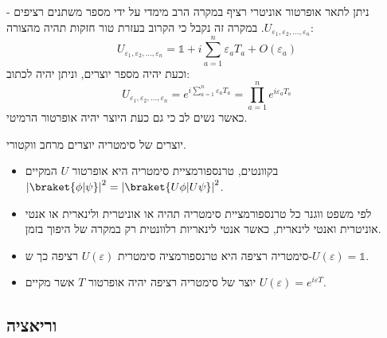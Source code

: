 \documentclass{tstextbook}
\begin{document}
\begin{proposition}
ניתן לתאר אופרטור אוניטרי רציף במקרה הרב מימדי על ידי מספר משתנים רציפים - \(U_{\varepsilon_{1},\varepsilon_{2},\dots, \varepsilon_{n}}\). במקרה זה נקבל כי הקרוב בעזרת טור חזקות תהיה מהצורה:
$$U_{\varepsilon_{1},\varepsilon_{2},\dots, \varepsilon_{n}}= \mathbb{1} + i\sum_{a=1}^{n} \varepsilon_{a}T_{a}+O\left( \varepsilon_{a} \right)$$
וכעת יהיה מספר יוצרים, וניתן יהיה לכתוב:
$$U_{\varepsilon_{1},\varepsilon_{2},\dots, \varepsilon_{n}} = e^{  i\sum_{a=1}^{n} \varepsilon_{a}T_{a}}=\prod _{a=1}^{n}e^{ i\varepsilon_{a}T_{a} }$$
כאשר נשים לב כי גם כעת היוצר יהיה אופרטור הרמיטי.

\end{proposition}
\begin{proposition}
יוצרים של סימטריה יוצרים מרחב ווקטורי.

\end{proposition}
\begin{summary}
  \begin{itemize}
    \item בקוונטים, טרנספורמציית סימטריה היא אופרטור \(U\) המקיים \(\left\lvert  \braket{ \phi | \psi }   \right\rvert ^{2}= \left\lvert  \braket{ U\phi | U\psi }   \right\rvert ^{2}\).
    \item לפי משפט ווגנר כל טרנספורמציית סימטריה תהיה או אוניטרית ולינארית או אנטי אוניטרית ואנטי לינארית, כאשר אנטי לינאריות רלוונטית רק במקרה של היפוך בזמן.
    \item סימטריה רציפה היא טרנספורמציה סימטרית \(U\left( \varepsilon \right)\) רציפה כך ש-\(U\left( \varepsilon \right)=\mathbb{1}\).
    \item יוצר של סימטריה רציפה יהיה אופרטור \(T\) אשר מקיים \(U\left( \varepsilon \right)=e^{ i\varepsilon T }\).
  \end{itemize}
\end{summary}
\subsection{וריאציה}
\end{document}
